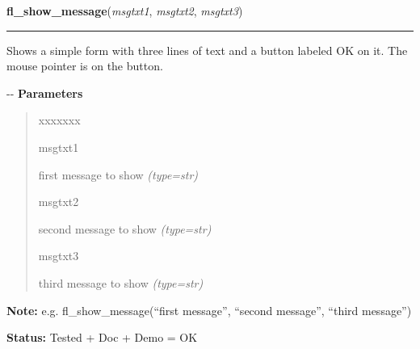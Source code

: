    \vspace{0.5ex}

\hspace{.8\funcindent}\begin{boxedminipage}{\funcwidth}

    \raggedright \textbf{fl\_show\_message}(\textit{msgtxt1}, \textit{msgtxt2}, \textit{msgtxt3})

    \vspace{-1.5ex}

    \rule{\textwidth}{0.5\fboxrule}
\setlength{\parskip}{2ex}

Shows a simple form with three lines of text and a button labeled
OK on it. The mouse pointer is on the button.

-{}-
\setlength{\parskip}{1ex}
      \textbf{Parameters}
      \vspace{-1ex}

      \begin{quote}
        \begin{Ventry}{xxxxxxx}

          \item[msgtxt1]


first message to show
            {\it (type=str)}

          \item[msgtxt2]


second message to show
            {\it (type=str)}

          \item[msgtxt3]


third message to show
            {\it (type=str)}

        \end{Ventry}

      \end{quote}

\textbf{Note:} 
e.g. fl\_show\_message(``first message'', ``second message'',
``third message'')


\textbf{Status:} 
Tested + Doc + Demo = OK


    \end{boxedminipage}

    \label{xformslib:flgoodies:fl_show_messages}

    \vspace{0.5ex}

